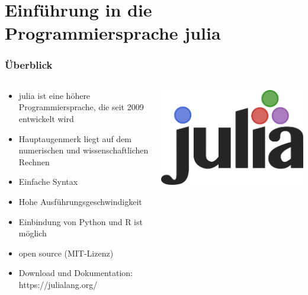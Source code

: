 \section{Einführung in die Programmiersprache julia}
\begin{frame}
\frametitle{Überblick}
    \begin{columns}[T]
        \begin{column}{0.65\textwidth}
            \begin{itemize}[<+->]
\item julia ist eine höhere Programmiersprache, die seit 2009 entwickelt wird
\item Hauptaugenmerk liegt auf dem numerischen und wissenschaftlichen Rechnen
\item Einfache Syntax
\item Hohe Ausführungsgeschwindigkeit
\item Einbindung von Python und R ist möglich
\item open source (MIT-Lizenz)
\item Download und Dokumentation: https://julialang.org/
\end{itemize}

        \end{column}
        \begin{column}{0.32\textwidth}
            \includegraphics[width=\textwidth]{images/logo-julia.png}
        \end{column}
    \end{columns}
    
\end{frame}
